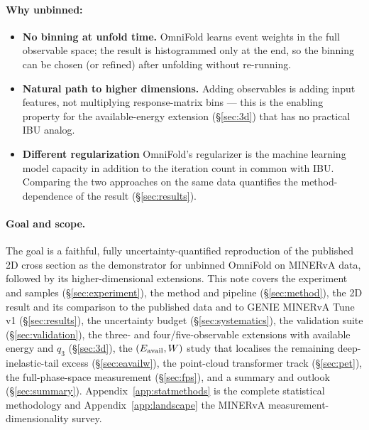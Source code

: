 \paragraph{Why unbinned:}
\begin{itemize}
  \item \textbf{No binning at unfold time.} OmniFold learns event weights in the
        full observable space; the result is histogrammed only at the end, so the
        binning can be chosen (or refined) after unfolding without re-running.
  \item \textbf{Natural path to higher dimensions.} Adding observables is adding
        input features, not multiplying response-matrix bins --- this is the
        enabling property for the available-energy extension
        (\S\ref{sec:3d}) that has no practical IBU analog.
  \item \textbf{Different regularization  } OmniFold's regularizer is the machine learning model capacity in addition to the iteration count in common with IBU. Comparing the two
        approaches on the same data quantifies the method-dependence of the result
        (\S\ref{sec:results}).
\end{itemize}

\paragraph{Goal and scope.}
The goal is a faithful, fully uncertainty-quantified reproduction of the
published 2D cross section as the demonstrator for unbinned OmniFold on MINERvA
data, followed by its higher-dimensional extensions. This note covers the
experiment and samples (\S\ref{sec:experiment}), the method and pipeline
(\S\ref{sec:method}), the 2D result and its comparison to the published data
and to GENIE MINERvA Tune v1 (\S\ref{sec:results}), the uncertainty budget
(\S\ref{sec:systematics}), the validation suite (\S\ref{sec:validation}), the
three- and four/five-observable extensions with available energy and $q_{3}$
(\S\ref{sec:3d}), the $(E_{\mathrm{avail}},W)$ study that localises the remaining
deep-inelastic-tail excess (\S\ref{sec:eavailw}), the point-cloud transformer
track (\S\ref{sec:pet}), the full-phase-space measurement
(\S\ref{sec:fps}), and a summary and outlook (\S\ref{sec:summary}).
Appendix~\ref{app:statmethods} is the complete statistical methodology and
Appendix~\ref{app:landscape} the MINERvA measurement-dimensionality survey.
